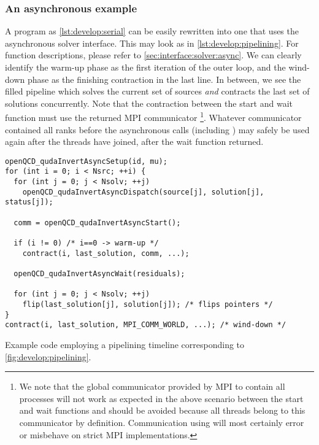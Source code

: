 \subsubsection{An asynchronous example}

A program as \cref{lst:develop:serial} can be easily rewritten into one that uses the asynchronous solver interface.
This may look as in \cref{lst:develop:pipelining}.
For function descriptions, please refer to \cref{sec:interface:solver:async}.
We can clearly identify the warm-up phase as the first iteration of the outer loop, and the wind-down phase as the finishing contraction in the last line.
In between, we see the filled pipeline which solves the current set of sources \emph{and} contracts the last set of solutions concurrently.
Note that the contraction between the start and wait function must use the returned MPI communicator \footnote{We note that the global communicator  provided by MPI to contain all processes will not work as expected in the above scenario between the start and wait functions and should be avoided because all threads belong to this communicator by definition. Communication using  will most certainly error or misbehave on strict MPI implementations.}.
Whatever communicator contained all ranks before the asynchronous calls (including ) may safely be used again after the threads have joined, \ie after the wait function returned.
\begin{codelisting}
\begin{verbatim}
openQCD_qudaInvertAsyncSetup(id, mu);
for (int i = 0; i < Nsrc; ++i) {
  for (int j = 0; j < Nsolv; ++j)
    openQCD_qudaInvertAsyncDispatch(source[j], solution[j], status[j]);

  comm = openQCD_qudaInvertAsyncStart();

  if (i != 0) /* i==0 -> warm-up */
    contract(i, last_solution, comm, ...);

  openQCD_qudaInvertAsyncWait(residuals);

  for (int j = 0; j < Nsolv; ++j)
    flip(last_solution[j], solution[j]); /* flips pointers */
}
contract(i, last_solution, MPI_COMM_WORLD, ...); /* wind-down */
\end{verbatim}
\caption{Example code employing a pipelining timeline corresponding to \cref{fig:develop:pipelining}.}
\label{lst:develop:pipelining}
\end{codelisting}

